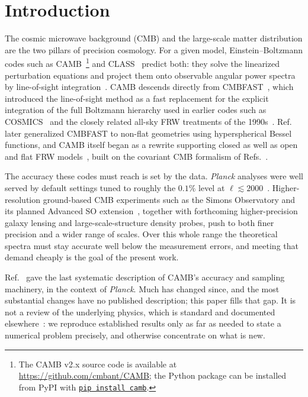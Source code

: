 \documentclass[prd, twocolumn, superscriptaddress, tightenlines, longbibliography, nofootinbib, eqsecnum, amsfonts, amsmath, floatfix, notitlepage]{revtex4-2}
\begin{document}

\section{Introduction}
\label{sec:intro}

The cosmic microwave background (CMB) and the large-scale matter distribution are
the two pillars of precision cosmology. For a given model, Einstein--Boltzmann
codes such as \textsc{CAMB}~\cite{Lewis:1999bs}\footnote{The
\textsc{CAMB} v2.x source code is available at \url{https://github.com/cmbant/CAMB};
the Python package can be installed from PyPI with
\href{https://pypi.org/project/camb/}{\texttt{pip install camb}}.} and
\textsc{CLASS}~\cite{Blas:2011rf} predict both: they solve the linearized
perturbation equations and project them onto observable angular power spectra by
line-of-sight integration~\cite{Seljak:1996is}. \textsc{CAMB} descends directly
from \textsc{CMBFAST}~\cite{Seljak:1996is}, which introduced the line-of-sight
method as a fast replacement for the explicit integration of the full Boltzmann
hierarchy used in earlier codes such as
\textsc{COSMICS}~\cite{Ma:1995ey,Bertschinger:1995er} and the closely related
all-sky FRW treatments of the 1990s~\cite{Hu:1998mn}.
Ref.~\cite{Zaldarriaga:1997va} later generalized \textsc{CMBFAST} to non-flat
geometries using hyperspherical Bessel functions, and \textsc{CAMB} itself began
as a rewrite supporting closed as well as open and flat FRW
models~\cite{Lewis:1999bs}, built on the covariant CMB formalism of
Refs.~\cite{Hu:1998mn,Challinor:2000as}.

The accuracy these codes must reach is set by the data. \textit{Planck} analyses
were well served by default settings tuned to roughly the $0.1\%$ level at
$\ell\lesssim 2000$~\cite{Howlett:2012mh}. Higher-resolution ground-based CMB
experiments such as the Simons Observatory and its planned Advanced SO
extension~\cite{SO:2018sim}, together with forthcoming higher-precision galaxy
lensing and large-scale-structure density probes, push to both finer precision
and a wider range of scales. Over this whole range the theoretical spectra must
stay accurate well below the measurement errors, and meeting that demand cheaply
is the goal of the present work.

Ref.~\cite{Howlett:2012mh} gave the last systematic description of
\textsc{CAMB}'s accuracy and sampling machinery, in the context of
\textit{Planck}. Much has changed since, and the most substantial changes have no
published description; this paper fills that gap. It is not a review of the
underlying physics, which is standard and documented
elsewhere~\cite{Challinor:2000as,Lewis:2006fu,Lewis:1999bs}: we reproduce
established results only as far as needed to state a numerical problem precisely,
and otherwise concentrate on what is new.
\end{document}
